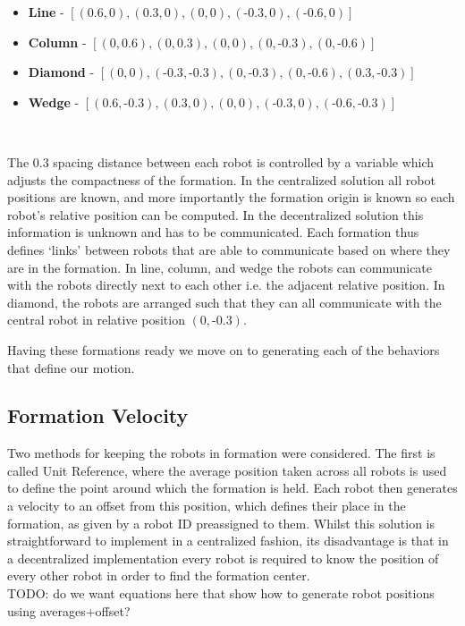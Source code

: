\documentclass[letterpaper, 10 pt, conference]{ieeeconf}  %
\begin{document}
\begin{itemize}
\item \textbf{Line} - $[(0.6,0), (0.3,0), (0,0), (\text{-}0.3,0), (\text{-}0.6,0)]$
\item \textbf{Column} - $[(0,0.6), (0,0.3), (0,0), (0,\text{-}0.3), (0,\text{-}0.6)]$
\item \textbf{Diamond} - $[(0,0), (\text{-}0.3,\text{-}0.3), (0,\text{-}0.3), (0,\text{-}0.6), (0.3,\text{-}0.3)]$
\item \textbf{Wedge} - $[(0.6,\text{-}0.3), (0.3,0), (0,0), (\text{-}0.3,0), (\text{-}0.6,\text{-}0.3)]$
\end{itemize}~

The $0.3$ spacing distance between each robot is controlled by a variable which adjusts the compactness of the formation. In the centralized solution all robot positions are known, and more importantly the formation origin is known so each robot's relative position can be computed. In the decentralized solution this information is unknown and has to be communicated. Each formation thus defines `links' between robots that are able to communicate based on where they are in the formation. In line, column, and wedge the robots can communicate with the robots directly next to each other i.e. the adjacent relative position. In diamond, the robots are arranged such that they can all communicate with the central robot in relative position $(0,\text{-}0.3)$.

Having these formations ready we move on to generating each of the behaviors that define our motion.

\subsection{Formation Velocity}

Two methods for keeping the robots in formation were considered. The first is called Unit Reference, where the average position taken across all robots is used to define the point around which the formation is held. Each robot then generates a velocity to an offset from this position, which defines their place in the formation, as given by a robot ID preassigned to them. Whilst this solution is straightforward to implement in a centralized fashion, its disadvantage is that in a decentralized implementation every robot is required to know the position of every other robot in order to find the formation center. \\

TODO: do we want equations here that show how to generate robot positions using averages+offset? \\
\end{document}
